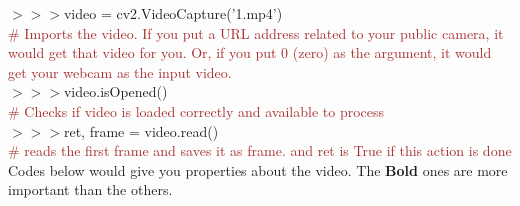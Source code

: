 \documentclass[a4paper,18pt]{article}
\begin{document}
$>>>$video = cv2.VideoCapture('1.mp4')\\{\textcolor{brown}{\# Imports the video. If you put a URL address related to your public camera, it would get that video for you. Or, if you put 0 (zero) as the argument, it would get your webcam as the input video.}}\\

$>>>$video.isOpened()\\{\textcolor{brown}{\# Checks if video is loaded correctly and available to process}}\\

$>>>$ret, frame = video.read()\\{\textcolor{brown}{\# reads the first frame and saves it as frame. and ret is True if this action is done}}\\

Codes below would give you properties about the video. The \textbf{Bold} ones are more important than the others.
\end{document}
